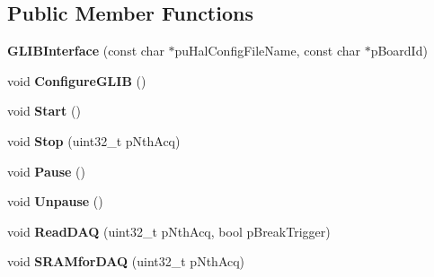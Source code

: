 \subsection*{Public Member Functions}
\begin{DoxyCompactItemize}
\item 
\hypertarget{class_ph2___hw_interface_1_1_g_l_i_b_interface_a6c11567e50b46ee41894ef4b55aa6ef9}{{\bfseries G\-L\-I\-B\-Interface} (const char $\ast$pu\-Hal\-Config\-File\-Name, const char $\ast$p\-Board\-Id)}\label{class_ph2___hw_interface_1_1_g_l_i_b_interface_a6c11567e50b46ee41894ef4b55aa6ef9}

\item 
\hypertarget{class_ph2___hw_interface_1_1_g_l_i_b_interface_a184c9b6bff4282e42218f66115627c91}{void {\bfseries Configure\-G\-L\-I\-B} ()}\label{class_ph2___hw_interface_1_1_g_l_i_b_interface_a184c9b6bff4282e42218f66115627c91}

\item 
\hypertarget{class_ph2___hw_interface_1_1_g_l_i_b_interface_a302bb9d57200f2da4889d5eb503777b8}{void {\bfseries Start} ()}\label{class_ph2___hw_interface_1_1_g_l_i_b_interface_a302bb9d57200f2da4889d5eb503777b8}

\item 
\hypertarget{class_ph2___hw_interface_1_1_g_l_i_b_interface_a9e17e9e892909e4e21f0066264ff852f}{void {\bfseries Stop} (uint32\-\_\-t p\-Nth\-Acq)}\label{class_ph2___hw_interface_1_1_g_l_i_b_interface_a9e17e9e892909e4e21f0066264ff852f}

\item 
\hypertarget{class_ph2___hw_interface_1_1_g_l_i_b_interface_a10d686f98e2978d93647aaf250404508}{void {\bfseries Pause} ()}\label{class_ph2___hw_interface_1_1_g_l_i_b_interface_a10d686f98e2978d93647aaf250404508}

\item 
\hypertarget{class_ph2___hw_interface_1_1_g_l_i_b_interface_a6a9df619d8d0c3961f9ae635cc5389c8}{void {\bfseries Unpause} ()}\label{class_ph2___hw_interface_1_1_g_l_i_b_interface_a6a9df619d8d0c3961f9ae635cc5389c8}

\item 
\hypertarget{class_ph2___hw_interface_1_1_g_l_i_b_interface_afdd87a6f34631f8d9cfba4409b6be979}{void {\bfseries Read\-D\-A\-Q} (uint32\-\_\-t p\-Nth\-Acq, bool p\-Break\-Trigger)}\label{class_ph2___hw_interface_1_1_g_l_i_b_interface_afdd87a6f34631f8d9cfba4409b6be979}

\item 
\hypertarget{class_ph2___hw_interface_1_1_g_l_i_b_interface_a8d97c10041d2376b17aa460b09ba02f6}{void {\bfseries S\-R\-A\-Mfor\-D\-A\-Q} (uint32\-\_\-t p\-Nth\-Acq)}\label{class_ph2___hw_interface_1_1_g_l_i_b_interface_a8d97c10041d2376b17aa460b09ba02f6}

\end{DoxyCompactItemize}
